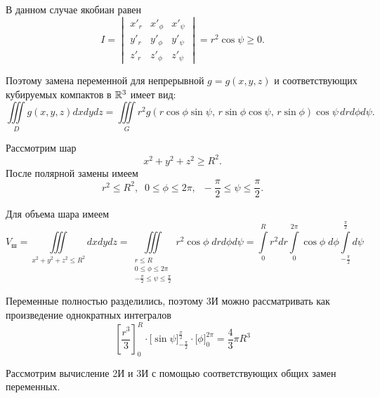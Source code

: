 \documentclass[../../main.tex]{subfiles}
\begin{document}
\begin{iex}
\begin{itemize}
			В данном случае якобиан равен
			\[I = \begin{vmatrix}
				x'_r & x'_\phi & x'_\psi \\
				y'_r & y'_\phi & y'_\psi \\
				z'_r & z'_\phi & z'_\psi
			\end{vmatrix}=r^2\cos{\psi}\geq 0.\]
			
			Поэтому замена переменной для непрерывной $g=g(x, y, z)$ и соответствующих
			кубируемых компактов в $\mathbb{R}^3$ имеет вид:
			\begin{equation}
			\label{lec15:45}
			\iiint\limits_{D} g(x, y, z) dx dy dz=
			\iiint\limits_{G} r^2g(r \cos{\phi} \sin{\psi},\, r \sin{\phi} \cos{\psi},\,
			 r \sin{\phi})\cos{\psi}\, dr d\phi d\psi.
			\end{equation}
		\end{itemize}
	\end{iex}

	\begin{exmp}
		Рассмотрим шар
		\[x^2 + y^2 + z^2 \geq R^2.\]
		После полярной замены имеем \[r^2 \leq R^2, \;\; 0 \leq \phi \leq 2\pi, 
		\;\; -\dfrac{\pi}{2} \leq \psi \leq \dfrac{\pi}{2}.\]
		
		Для объема шара имеем
		\[V_{\text{ш}} = \iiint\limits_{x^2 + y^2 + z^2 \leq R^2} dxdydz = 
		\iiint\limits_{
			\substack{
			r \leq R\\
			0 \leq \phi \leq 2\pi\\
			-\frac{\pi}{2} \leq \psi \leq \frac{\pi}{2}
			}
		}r^2\cos \phi \; dr d\phi d\psi = \int\limits_{0}^{R}r^2dr\int\limits_{0}^
	{2\pi}\cos\phi \; d\phi \int\limits_{-\frac{\pi}{2}}^{\frac{\pi}{2}}d\psi\]
		
		Переменные полностью разделились, поэтому 3И можно рассматривать как 
		произведение
		 однократных интегралов
		\[
		\left[\dfrac{r^3}{3}\right]_{0}^{R} \cdot \Big[\sin \psi 
		\Big]_{-\frac{\pi}{2}}^{\frac{\pi}{2}} \cdot \Big[\phi\Big]_{0}^{2\pi} = 
		\dfrac{4}{3} \pi R^3 
		\]
	\end{exmp}
	
	Рассмотрим вычисление 2И и 3И с помощью соответствующих общих замен 
	переменных. 
	
\end{document}
